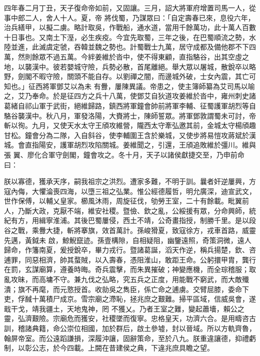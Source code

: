 \begin{pinyinscope}
 四年春二月丁丑，天子復命帝如前，又固讓。三月，詔大將軍府增置司馬一人，從事中郎二人，舍人十人。夏，帝
 將伐蜀，乃謀眾曰：「自定壽春已來，息役六年，治兵繕甲，以擬二虜。略計取吳，作戰船，通水道，當用千餘萬功，此十萬人百數十日事也。又南土下溼，必生疾疫。今宜先取蜀，三年之後，在巴蜀順流之勢，水陸並進，此滅虞定虢，吞韓並魏之勢也。計蜀戰士九萬，居守成都及備他郡不下四萬，然則餘眾不過五萬。今絆姜維於沓中，使不得東顧，直指駱谷，出其空虛之地，以襲漢中。彼若嬰城守險，兵勢必散，首尾離絕。舉大眾以屠城，散銳卒以略野，劍閣不暇守險，關頭不能自存。以劉禪之闇，而邊城外破，士女內震，其亡可知也。」征西將軍鄧艾以為未
 有釁，屢陳異議。帝患之，使主簿師纂為艾司馬以喻之，艾乃奉命。於是征四方之兵十八萬，使鄧艾自狄道攻姜維於沓中，雍州刺史諸葛緒自祁山軍于武街，絕維歸路，鎮西將軍鐘會帥前將軍李輔、征蜀護軍胡烈等自駱谷襲漢中。秋八月，軍發洛陽，大賚將士，陳師誓眾。將軍鄧敦謂蜀未可討，帝斬以徇。九月，又使天水太守王頎攻維營，隴西太守牽弘邀其前，金城太守楊頎趣甘松。鐘會分為二隊，入自斜谷，使李輔圍王含於樂城，又使步將易愷攻蔣斌於漢城。會直指陽安，護軍胡烈攻陷關城。姜維聞之，引還，王頎追敗維於彊川。維與張
 翼、廖化合軍守劍閣，鐘會攻之。冬十月，天子以諸侯獻捷交至，乃申前命曰：



 朕以寡德，獲承天序，嗣我祖宗之洪烈。遭家多難，不明于訓。曩者奸逆屢興，方寇內侮，大懼淪喪四海，以墮三祖之弘業。惟公經德履哲，明允廣深，迪宣武文，世作保傅，以輔乂皇家。櫛風沐雨，周旋征伐，劬勞王室，二十有餘載。毗翼前人，乃斷大政，克厭不端，維安社稷。暨儉、欽之亂，公綏援有眾，分命興師，統紀有方，用緝寧淮浦。其後巴蜀屢侵，西土不靖，公奇畫指授，制勝千里。是以段谷之戰，乘釁大捷，斬將搴旗，效首萬計。孫峻猾夏，致寇徐方，戎車首路，威靈先邁，黃鉞未
 啟，鯨鯢竄迹。孫壹構隙，自相疑阻，幽鑒遠照，奇策洞微，遠人歸命，作籓南夏，爰授銳卒，畢力戎行。暨諸葛誕，滔天作逆，稱兵揚楚，欽、咨逋罪，同惡相濟，帥其蝥賊，以入壽春，憑阻淮山，敢距王命。公躬擐甲胄，龔行在罰，玄謀廟算，遵養時晦。奇兵震擊，而朱異摧破；神變應機，而全琮稽服；取亂攻昧，而高墉不守。兼九伐之弘略，究五兵之正度，用能戰不窮武，而大敵殲潰；旗不再麾，而元憝授首。收勍吳之雋臣，係亡命之逋虜。交臂屈膝，委命下吏，俘馘十萬積尸成京。雪宗廟之滯恥，拯兆庶之艱難。掃平區域，信威吳會，遂戢干戈，靖我疆土，天地鬼神，罔
 不獲乂。乃者王室之難，變起蕭墻，賴公之靈，弘濟艱險。宗廟危而獲安，社稷墜而復寧。忠格皇天，功濟六合。是用疇咨古訓，稽諸典籍，命公崇位相國，加於群后，啟土參墟，封以晉域。所以方軌齊魯，翰屏帝室。而公遠蹈謙損，深履沖讓，固辭策命，至於八九。朕重違讓德，抑禮虧制，以彰公志，於今四載。上闕在昔建侯之典，下違兆庶具瞻之望。




\end{pinyinscope}
